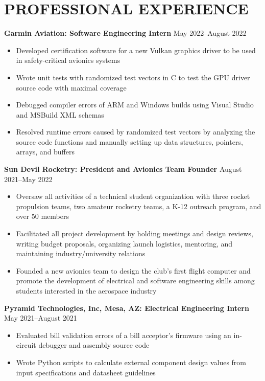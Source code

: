 \documentclass{article}
\begin{document}
\section{PROFESSIONAL EXPERIENCE}
\textbf{Garmin Aviation: Software Engineering Intern}
\hfill
\vspace{0.5em}
May 2022--August 2022
\begin{itemize}
\item{Developed certification software for a new Vulkan graphics driver to be used in safety-critical avionics systems}
\item{Wrote unit tests with randomized test vectors in C to test the GPU driver source code with maximal coverage}
\item{Debugged compiler errors of ARM and Windows builds using Visual Studio and MSBuild XML schemas}
\item{Resolved runtime errors caused by randomized test vectors by analyzing the source code functions and manually setting up data structures, pointers, arrays, and buffers}
\end{itemize}
\vspace{1em}
\textbf{Sun Devil Rocketry: President and Avionics Team Founder}
\hfill
\vspace{0.5em}
August 2021--May 2022
\begin{itemize}
\item{Oversaw all activities of a technical student organization with three rocket propulsion teams, two amateur rocketry teams, a K-12 outreach program, and over 50 members   }
\item{Facilitated all project development by holding meetings and design reviews, writing budget proposals, organizing launch logistics, mentoring, and maintaining industry/university relations}
\item{Founded a new avionics team to design the club's first flight computer and promote the development of electrical and software engineering skills among students interested in the aerospace industry}
\vspace{1em}
\end{itemize}
\textbf{Pyramid Technologies, Inc, Mesa, AZ: Electrical Engineering Intern}
\hfill 
\vspace{0.5em}
May 2021--August 2021
\begin{itemize}
\item{Evaluated bill validation errors of a bill acceptor's firmware using an in-circuit debugger and assembly source code}
\item{Wrote Python scripts to calculate external component design values from input specifications and datasheet guidelines}
\end{itemize}
\end{document}
